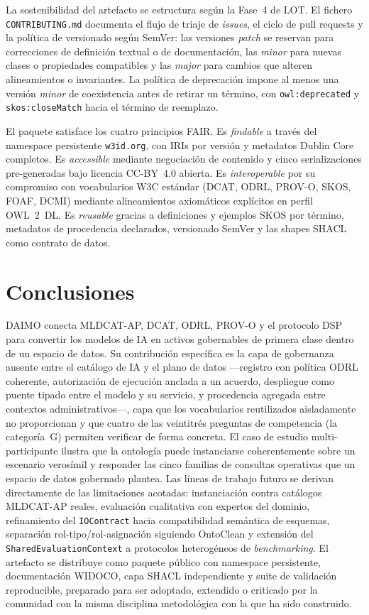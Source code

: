 \documentclass[Afour,sagev,times]{sagej}
\newcommand{\code}[1]{\texttt{#1}}
\begin{document}
La sostenibilidad del artefacto se estructura según la Fase~4 de LOT. El fichero \code{CONTRIBUTING.md} documenta el flujo de triaje de \emph{issues}, el ciclo de pull requests y la política de versionado según SemVer: las versiones \emph{patch} se reservan para correcciones de definición textual o de documentación, las \emph{minor} para nuevas clases o propiedades compatibles y las \emph{major} para cambios que alteren alineamientos o invariantes. La política de deprecación impone al menos una versión \emph{minor} de coexistencia antes de retirar un término, con \code{owl:deprecated} y \code{skos:closeMatch} hacia el término de reemplazo.

El paquete satisface los cuatro principios FAIR. Es \emph{findable} a través del namespace persistente \code{w3id.org}, con IRIs por versión y metadatos Dublin Core completos. Es \emph{accessible} mediante negociación de contenido y cinco serializaciones pre-generadas bajo licencia CC-BY~4.0 abierta. Es \emph{interoperable} por su compromiso con vocabularios W3C estándar (DCAT, ODRL, PROV-O, SKOS, FOAF, DCMI) mediante alineamientos axiomáticos explícitos en perfil OWL~2~DL. Es \emph{reusable} gracias a definiciones y ejemplos SKOS por término, metadatos de procedencia declarados, versionado SemVer y las shapes SHACL como contrato de datos.

\section{Conclusiones}\label{sec:conclusion}

DAIMO conecta MLDCAT-AP, DCAT, ODRL, PROV-O y el protocolo DSP para convertir los modelos de IA en activos gobernables de primera clase dentro de un espacio de datos. Su contribución específica es la capa de gobernanza ausente entre el catálogo de IA y el plano de datos ---registro con política ODRL coherente, autorización de ejecución anclada a un acuerdo, despliegue como puente tipado entre el modelo y su servicio, y procedencia agregada entre contextos administrativos---, capa que los vocabularios reutilizados aisladamente no proporcionan y que cuatro de las veintitrés preguntas de competencia (la categoría~G) permiten verificar de forma concreta. El caso de estudio multi-participante ilustra que la ontología puede instanciarse coherentemente sobre un escenario verosímil y responder las cinco familias de consultas operativas que un espacio de datos gobernado plantea. Las líneas de trabajo futuro se derivan directamente de las limitaciones acotadas: instanciación contra catálogos MLDCAT-AP reales, evaluación cualitativa con expertos del dominio, refinamiento del \code{IOContract} hacia compatibilidad semántica de esquemas, separación rol-tipo/rol-asignación siguiendo OntoClean y extensión del \code{SharedEvaluationContext} a protocolos heterogéneos de \emph{benchmarking}. El artefacto se distribuye como paquete público con namespace persistente, documentación WIDOCO, capa SHACL independiente y suite de validación reproducible, preparado para ser adoptado, extendido o criticado por la comunidad con la misma disciplina metodológica con la que ha sido construido.
\end{document}
